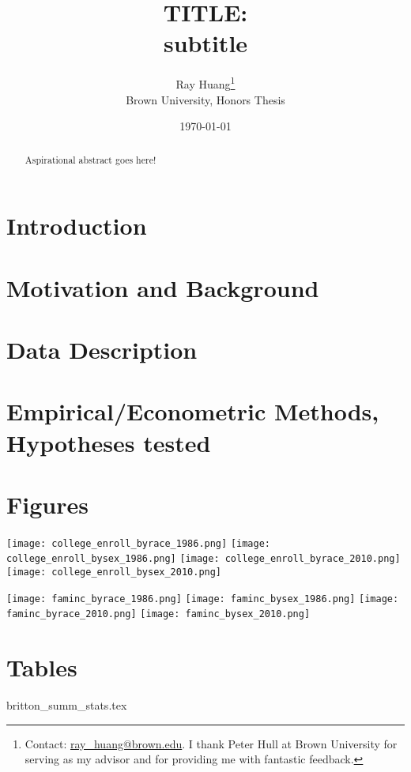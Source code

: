 \documentclass{article}
\title{TITLE:\texorpdfstring{\\}{} subtitle}
\author{Ray Huang\thanks{Contact:
    \href{mailto:ray_huang@brown.edu}{ray\_huang@brown.edu}.
     I thank Peter Hull at Brown University for serving as my advisor and for providing me with fantastic feedback.}
     \\Brown University, Honors Thesis}
\date{\today}
\begin{document}
\maketitle

\begin{abstract}
\noindent Aspirational abstract goes here!
\end{abstract}

\clearpage

\section*{Introduction}

\section*{Motivation and Background}

\section*{Data Description}


\section*{Empirical/Econometric Methods, Hypotheses tested}

\section*{Figures}

\begin{center}
\texttt{[image: college\_enroll\_byrace\_1986.png]}
\texttt{[image: college\_enroll\_bysex\_1986.png]}
\texttt{[image: college\_enroll\_byrace\_2010.png]}
\texttt{[image: college\_enroll\_bysex\_2010.png]}
\end{center}

\begin{center}
  \texttt{[image: faminc\_byrace\_1986.png]}
  \texttt{[image: faminc\_bysex\_1986.png]}
  \texttt{[image: faminc\_byrace\_2010.png]}
  \texttt{[image: faminc\_bysex\_2010.png]}
  \end{center}


\section*{Tables}
{britton_summ_stats.tex}
\end{document}
